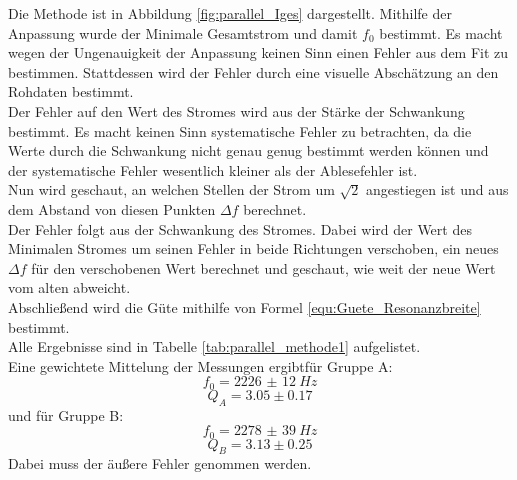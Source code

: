 \documentclass[12pt,a4paper]{article}
\begin{document}
Die Methode ist in Abbildung \ref{fig:parallel_Iges} dargestellt.
Mithilfe der Anpassung wurde der Minimale Gesamtstrom und damit $f_0$ bestimmt. Es macht wegen der Ungenauigkeit der Anpassung keinen Sinn einen Fehler aus dem Fit zu bestimmen.  Stattdessen wird der Fehler durch eine visuelle Abschätzung an den Rohdaten bestimmt.\\
Der Fehler auf den Wert des Stromes wird aus der Stärke der Schwankung bestimmt. Es macht keinen Sinn systematische Fehler zu betrachten, da die Werte durch die Schwankung nicht genau genug bestimmt werden können und der systematische Fehler wesentlich kleiner als der Ablesefehler ist.\\
Nun wird geschaut, an welchen Stellen der Strom um $\sqrt{2}$ angestiegen ist und aus dem Abstand von diesen Punkten $\Delta f$ berechnet.\\
Der Fehler folgt aus der Schwankung des Stromes. Dabei wird der Wert des Minimalen Stromes um seinen Fehler in beide Richtungen verschoben, ein neues $\Delta f$ für den verschobenen Wert berechnet und geschaut, wie weit der neue Wert vom alten abweicht.\\
Abschließend wird die Güte mithilfe von Formel \ref{equ:Guete_Resonanzbreite} bestimmt.\\
Alle Ergebnisse sind in Tabelle \ref{tab:parallel_methode1} aufgelistet.\\
Eine gewichtete Mittelung der Messungen ergibtfür Gruppe A:
\begin{equation}
f_0 = \SI{2226(12)}{Hz}
\end{equation}
\begin{equation}
Q_A = 3.05\pm 0.17 
\end{equation}
und für Gruppe B:
\begin{equation}
f_0 = \SI{2278(39)}{Hz}
\end{equation}
\begin{equation}
Q_B = 3.13\pm 0.25 
\end{equation}
Dabei muss der äußere Fehler genommen werden.
\end{document}
